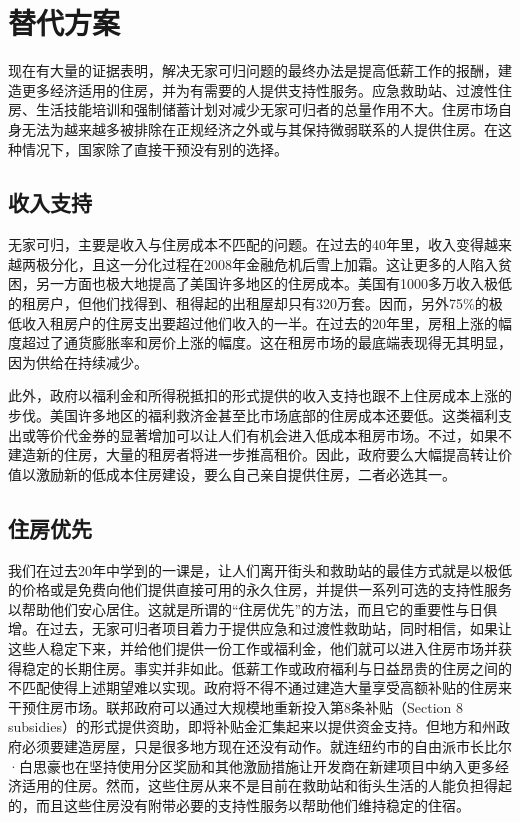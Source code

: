 \documentclass[fontset=fandol, a4paper, 12pt, openright]{ctexbook}
\begin{document}
\section{替代方案}

现在有大量的证据表明，解决无家可归问题的最终办法是提高低薪工作的报酬，建造更多经济适用的住房，并为有需要的人提供支持性服务。应急救助站、过渡性住房、生活技能培训和强制储蓄计划对减少无家可归者的总量作用不大。住房市场自身无法为越来越多被排除在正规经济之外或与其保持微弱联系的人提供住房。在这种情况下，国家除了直接干预没有别的选择。

\subsection{收入支持}
无家可归，主要是收入与住房成本不匹配的问题。在过去的40年里，收入变得越来越两极分化，且这一分化过程在2008年金融危机后雪上加霜。这让更多的人陷入贫困，另一方面也极大地提高了美国许多地区的住房成本。美国有1000多万收入极低的租房户，但他们找得到、租得起的出租屋却只有320万套。因而，另外75\%的极低收入租房户的住房支出要超过他们收入的一半。在过去的20年里，房租上涨的幅度超过了通货膨胀率和房价上涨的幅度。这在租房市场的最底端表现得无其明显，因为供给在持续减少。

此外，政府以福利金和所得税抵扣的形式提供的收入支持也跟不上住房成本上涨的步伐。美国许多地区的福利救济金甚至比市场底部的住房成本还要低。这类福利支出或等价代金券的显著增加可以让人们有机会进入低成本租房市场。不过，如果不建造新的住房，大量的租房者将进一步推高租价。因此，政府要么大幅提高转让价值以激励新的低成本住房建设，要么自己亲自提供住房，二者必选其一。

\subsection{住房优先}
我们在过去20年中学到的一课是，让人们离开街头和救助站的最佳方式就是以极低的价格或是免费向他们提供直接可用的永久住房，并提供一系列可选的支持性服务以帮助他们安心居住。这就是所谓的“住房优先”的方法，而且它的重要性与日俱增。在过去，无家可归者项目着力于提供应急和过渡性救助站，同时相信，如果让这些人稳定下来，并给他们提供一份工作或福利金，他们就可以进入住房市场并获得稳定的长期住房。事实并非如此。低薪工作或政府福利与日益昂贵的住房之间的不匹配使得上述期望难以实现。政府将不得不通过建造大量享受高额补贴的住房来干预住房市场。联邦政府可以通过大规模地重新投入第8条补贴（Section 8 subsidies）的形式提供资助，即将补贴金汇集起来以提供资金支持。但地方和州政府必须要建造房屋，只是很多地方现在还没有动作。就连纽约市的自由派市长比尔·白思豪也在坚持使用分区奖励和其他激励措施让开发商在新建项目中纳入更多经济适用的住房。然而，这些住房从来不是目前在救助站和街头生活的人能负担得起的，而且这些住房没有附带必要的支持性服务以帮助他们维持稳定的住宿。
\end{document}
